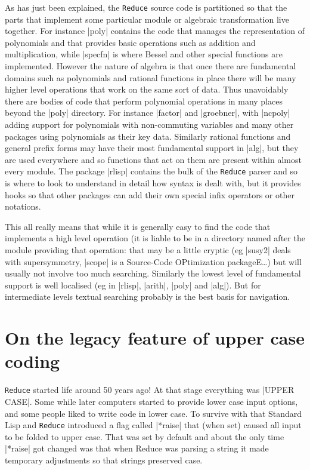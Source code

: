 \documentclass[12pt,twoside,openright]{memoir}
\newcommand{\reduce}{\texttt{Reduce}\xspace}
\begin{document}
As has just been explained, the \reduce source code is partitioned so that the
parts that implement some particular module or algebraic transformation live
together. For instance |poly| contains the code that manages the
representation of polynomials and that provides basic operations such as
addition and multiplication, while |specfn| is where Bessel and other special
functions are implemented. However the nature of algebra is that once there
are fundamental domains such as polynomials and rational functions in place
there will be many higher level operations that work on the same sort of data.
Thus unavoidably there are bodies of code that perform polynomial operations
in many places beyond the |poly| directory. For instance |factor| and
|groebner|, with |ncpoly| adding support for polynomials with non-commuting
variables and many other packages using polynomials as their key data.
Similarly rational functions and general prefix forms may have their most
fundamental support in |alg|, but they are used everywhere and so functions
that act on them are present within almost every module. The package |rlisp|
contains the bulk of the \reduce parser and so is where to look to understand
in detail how syntax is dealt with, but it provides hooks so that other
packages can add their own special infix operators or other notations.

This all really means that while it is generally easy to find the code that
implements a high level operation (it is liable to be in a directory
named after the module providing that operation: that may be a little
cryptic (eg |susy2| deals with supersymmetry, |scope| is a Source-Code
OPtimization packageE\ldots) but will usually not involve too much searching.
Similarly the lowest level of fundamental support is well localised (eg in
|rlisp|, |arith|, |poly| and |alg|). But for intermediate levels textual
searching probably is the best basis for navigation.

\section{On the legacy feature of upper case coding}
\label{sec:case}

\reduce started life around 50 years ago! At that stage everything was
|UPPER CASE|.
Some while later computers started to provide lower case input options,
and some people liked to write code in lower case. To survive with that
Standard Lisp and \reduce introduced a flag called |*raise| that (when set)
caused all input to be folded to upper case. That was set by default and
about the only time |*raise| got changed was that when Reduce
was parsing a string it made temporary adjustments so that strings
preserved case.
\end{document}
